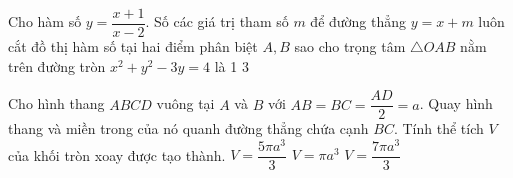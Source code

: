 \begin{ex}%
Cho hàm số $y=\dfrac{x+1}{x-2}$. Số các giá trị tham số $m$ để đường thẳng $y=x+m$ luôn cắt đồ thị hàm số tại hai điểm phân biệt $A,B$ sao cho trọng tâm $\triangle OAB$ nằm trên đường tròn $x^2+y^2-3y=4$ là
{1}
{}
{3}
\end{ex}

\begin{ex}%
Cho hình thang $ABCD$ vuông tại $A$ và $B$ với $AB=BC=\dfrac{AD}{2}=a$. Quay hình thang và miền trong của nó quanh đường thẳng chứa cạnh $BC$. Tính thể tích $V$ của khối tròn xoay được tạo thành.
{\True $V=\dfrac{5\pi a^3}{3}$}
{$V=\pi a^3$}
{$V=\dfrac{7\pi a^3}{3}$}
\end{ex}

